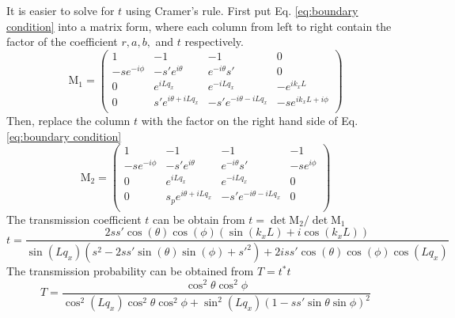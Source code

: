     It is easier to solve for $t$ using Cramer's rule. First put Eq. \ref{eq:boundary condition} into a matrix form, 
    where each column from left to right contain the factor of the coefficient $r, a, b,$ and $t$ respectively.
    \begin{equation}
        \mathrm{M_1}=
            \begin{pmatrix}
                1 & -1 & -1 & 0 \\
                -s e^{-i \phi } & -s'e^{i \theta } & e^{-i \theta } s' & 0 \\
                0 & e^{i L q_x} & e^{-i L q_x} & -e^{i k_x L} \\
                0 & s' e^{i \theta +i L q_x} & -s' e^{-i \theta -i L q_x} & -s e^{i k_x L+i \phi } \\
            \end{pmatrix}
    \end{equation}
    Then, replace the column $t$ with the factor on the right hand side of Eq. \ref{eq:boundary condition}
    \begin{equation}
        \mathrm{M_2}=
            \begin{pmatrix}
                1 & -1 & -1 & -1 \\
                -s e^{-i \phi } & -s'e^{i \theta }  & e^{-i \theta } s' & -s e^{i \phi } \\
                0 & e^{i L q_x} & e^{-i L q_x} & 0 \\
                0 & s_p e^{i \theta +i L q_x} & -s' e^{-i \theta -i L q_x} & 0 \\
            \end{pmatrix}
    \end{equation}
    The transmission coefficient $t$ can be obtain from $t = \det \mathrm{M_2}/ \det \mathrm{M_1}$
    \begin{equation}
        t = \frac{2 s s' \cos (\theta ) \cos (\phi ) (\sin (k_x L)+i \cos (k_x L))}
        {\sin (L q_x) \left(s^2-2 s s' \sin (\theta ) \sin (\phi )+s'^2\right)+2 i s s' \cos (\theta ) \cos (\phi ) \cos (L q_x)}
    \end{equation}
    The transmission probability can be obtained from $T = t^* t$
    \begin{equation} \label{eq:tp}
        T=\frac{\cos^2 \theta \cos^2 \phi}{\cos^2 (L q_x) \cos^2 \theta \cos^2 \phi + \sin^2 (Lq_x)(1-ss'\sin \theta \sin \phi )^2}
    \end{equation}
